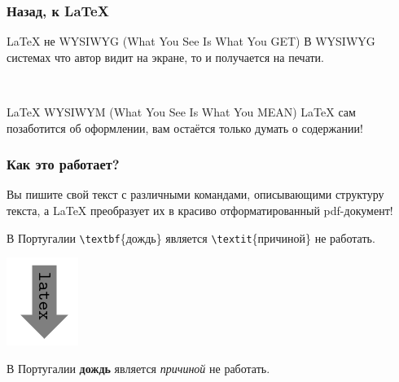 \documentclass[aspectratio=169,newPxFont]{beamer}
\begin{document}


\begin{frame}
\frametitle{Назад, к  \LaTeX}
\LaTeX{} не WYSIWYG (What You See Is What You GET)
В WYSIWYG системах что автор видит на экране, то и получается на печати.

\mbox{ }

\LaTeX{} WYSIWYM (What You See Is What You \alert{MEAN})
\LaTeX{} сам позаботится об оформлении, вам остаётся только думать о содержании!
\end{frame}



\begin{frame}[fragile]
\frametitle{Как это работает?}
Вы пишите свой текст с различными \alert{командами}, описывающими структуру текста, а \LaTeX{} преобразует их в красиво отформатированный pdf-документ!

\begin{mdframed}[backgroundcolor=LTXLightGreen]
В Португалии \verb|\textbf|\{дождь\} является \verb|\textit|\{причиной\}  не  работать.
\end{mdframed}

\centering
   \includegraphics[scale=0.3]{fuc.png}%

\begin{mdframed}[backgroundcolor=LTXLightGreen]
В Португалии \textbf{дождь} является \textit{причиной} не работать.
\end{mdframed}
\end{frame}
\end{document}
